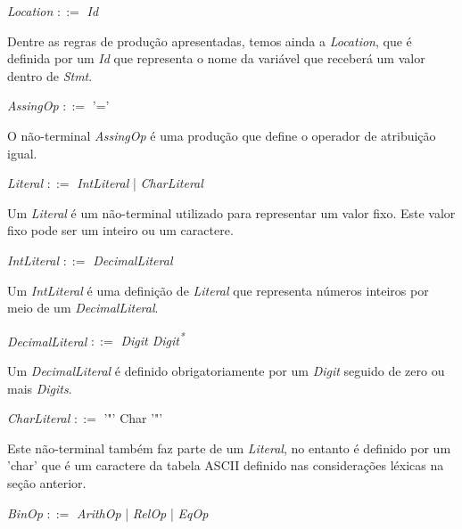 \documentclass{scrreprt}
\begin{document}
\begin{center}
\textit{Location }$::=$\textit{ Id}
\end{center}

\par Dentre as regras de produção apresentadas, temos ainda a \textit{Location}, que é definida por um \textit{Id} que representa o nome da variável que receberá um valor dentro de \textit{Stmt}.

\begin{center}
\textit{AssingOp }$::=$ '='
\end{center}

\par O não-terminal \textit{AssingOp} é uma produção que define o operador de atribuição igual.

\begin{center}
\textit{Literal }$::=$\textit{ IntLiteral} | \textit{ CharLiteral}
\end{center}

\par Um \textit{Literal} é um não-terminal utilizado para representar um valor fixo. Este valor fixo pode ser um inteiro ou um caractere.

\begin{center}
\textit{IntLiteral }$::=$\textit{ DecimalLiteral}
\end{center}

\par Um \textit{IntLiteral} é uma definição de \textit{Literal} que representa números inteiros por meio de um \textit{DecimalLiteral}.

\begin{center}
\textit{DecimalLiteral }$::=$\textit{ Digit Digit\textsuperscript{*}}
\end{center}

\par Um \textit{DecimalLiteral} é definido obrigatoriamente por um \textit{Digit} seguido de zero ou mais \textit{Digits}.

\begin{center}
\textit{CharLiteral }$::=$ '"' Char '"'
\end{center}

\par Este não-terminal também faz parte de um \textit{Literal}, no entanto é definido por um 'char' que é um caractere da tabela ASCII definido nas considerações léxicas na seção anterior. 

\begin{center}
\textit{BinOp }$::=$\textit{ ArithOp }|\textit{ RelOp }|\textit{ EqOp}
\end{center}
\end{document}
